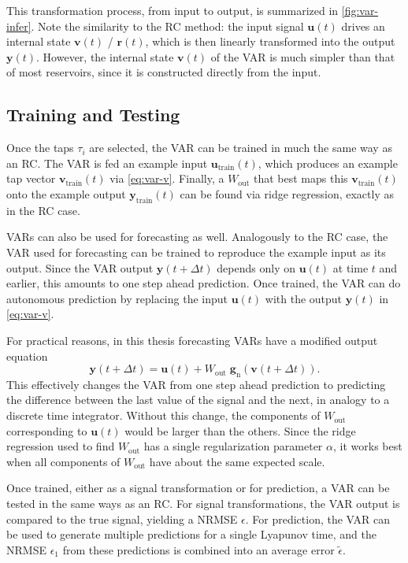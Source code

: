 This transformation process, from input to output, is summarized in
\cref{fig:var-infer}. Note the similarity to the RC method: the input
signal $\bm{u}(t)$ drives an internal state $\bm{v}(t)$ / $\bm{r}(t)$,
which is then linearly transformed into the output
$\bm{y}(t)$. However, the internal state $\bm{v}(t)$ of the VAR is
much simpler than that of most reservoirs, since it is constructed
directly from the input.

\subsection{Training and Testing}

Once the taps $\tau_i$ are selected, the VAR can be trained in much
the same way as an RC. The VAR is fed an example input
$\bm{u}_\text{train}(t)$, which produces an example tap vector
$\bm{v}_\text{train}(t)$ via \cref{eq:var-v}. Finally, a $W_\text{out}$
that best maps this $\bm{v}_\text{train}(t)$ onto the example output
$\bm{y}_\text{train}(t)$ can be found via ridge regression, exactly as
in the RC case.

VARs can also be used for forecasting as well. Analogously to the RC
case, the VAR used for forecasting can be trained to reproduce the
example input as its output. Since the VAR output $\bm{y}(t + \Delta
t)$ depends only on $\bm{u}(t)$ at time $t$ and earlier, this amounts
to one step ahead prediction. Once trained, the VAR can do autonomous
prediction by replacing the input $\bm{u}(t)$ with the output
$\bm{y}(t)$ in \cref{eq:var-v}.

For practical reasons, in this thesis forecasting VARs have a modified
output equation
\begin{equation}
  \bm{y}(t + \Delta t) = \bm{u}(t) + W_\text{out}\;\bm{g}_\text{n}\left(\bm{v}(t + \Delta t)\right).
\end{equation}
This effectively changes the VAR from one step ahead prediction to
predicting the difference between the last value of the signal and the
next, in analogy to a discrete time integrator. Without this change,
the components of $W_\text{out}$ corresponding to $\bm{u}(t)$ would be
larger than the others. Since the ridge regression used to find
$W_\text{out}$ has a single regularization parameter $\alpha$, it
works best when all components of $W_\text{out}$ have about the same
expected scale.

Once trained, either as a signal transformation or for prediction, a
VAR can be tested in the same ways as an RC. For signal
transformations, the VAR output is compared to the true signal,
yielding a NRMSE $\epsilon$. For prediction, the VAR can be used to
generate multiple predictions for a single Lyapunov time, and the
NRMSE $\epsilon_1$ from these predictions is combined into an average
error $\tilde{\epsilon}$.

